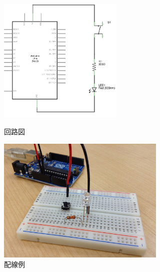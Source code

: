 \documentclass[11pt,a4paper]{jarticle}
\begin{document}
\begin{figure}[h!]
 \begin{minipage}{0.5\columnwidth}
  \centering
  \includegraphics[height=60mm]{img/circuit01.eps}
  \caption{回路図}
  \label{circuit}
 \end{minipage}
 \begin{minipage}{0.5\columnwidth}
  \centering
  \includegraphics[height=60mm]{img/sample_circuit.eps}
  \caption{配線例}
 \end{minipage}
\end{figure}
\end{document}
